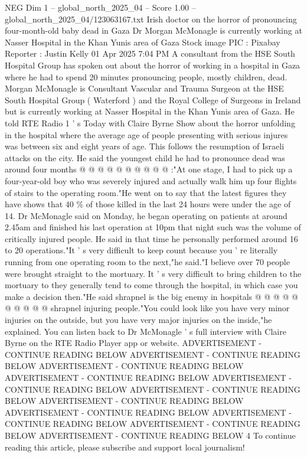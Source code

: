 \begin{textsample}{NEG Dim 1 – global\_north\_2025\_04 – Score 1.00 – global\_north\_2025\_04/123063167.txt}  \label{ex:f1_neg_038}
Irish doctor on the horror of pronouncing four-month-old baby dead in Gaza Dr Morgan McMonagle is currently working at Nasser Hospital in the Khan Yunis area of Gaza Stock image PIC : Pixabay Reporter : Justin Kelly 01 Apr 2025 7:04 PM A consultant from the HSE South Hospital Group has spoken out about the horror of working in a hospital in Gaza where he had to spend 20 minutes pronouncing people, mostly children, dead.
Morgan McMonagle is Consultant Vascular and Trauma Surgeon at the HSE South Hospital Group ( Waterford ) and the Royal College of Surgeons in Ireland but is currently working at Nasser Hospital in the Khan Yunis area of Gaza.
He told RTE Radio 1 ' s Today with Claire Byrne Show about the horror unfolding in the hospital where the average age of people presenting with serious injures was between six and eight years of age.
This follows the resumption of Israeli attacks on the city.
He said the youngest child he had to pronounce dead was around four months @ @ @ @ @ @ @ @ @ @ :"At one stage, I had to pick up a four-year-old boy who was severely injured and actually walk him up four flights of stairs to the operating room."He went on to say that the latest figures they have shows that 40 \% of those killed in the last 24 hours were under the age of 14.
Dr McMonagle said on Monday, he began operating on patients at around 2.45am and finished his last operation at 10pm that night such was the volume of critically injured people.
He said in that time he personally performed around 16 to 20 operations."It ' s very difficult to keep count because you ' re literally running from one operating room to the next,"he said."I believe over 70 people were brought straight to the mortuary.
It ' s very difficult to bring children to the mortuary to they generally tend to come through the hospital, in which case you make a decision then."He said shrapnel is the big enemy in hospitals @ @ @ @ @ @ @ @ @ @ shrapnel injuring people."You could look like you have very minor injuries on the outside, but you have very major injuries on the inside,"he explained.
You can listen back to Dr McMonagle ' s full interview with Claire Byrne on the RTE Radio Player app or website.
ADVERTISEMENT - CONTINUE READING BELOW ADVERTISEMENT - CONTINUE READING BELOW ADVERTISEMENT - CONTINUE READING BELOW ADVERTISEMENT - CONTINUE READING BELOW ADVERTISEMENT - CONTINUE READING BELOW ADVERTISEMENT - CONTINUE READING BELOW ADVERTISEMENT - CONTINUE READING BELOW ADVERTISEMENT - CONTINUE READING BELOW ADVERTISEMENT - CONTINUE READING BELOW ADVERTISEMENT - CONTINUE READING BELOW ADVERTISEMENT - CONTINUE READING BELOW 4 To continue reading this article, please subscribe and support local journalism!

\end{textsample}
